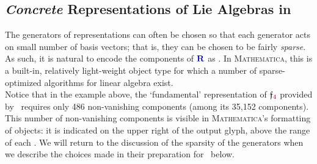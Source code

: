 \documentclass[12pt,a4paper]{article}\let\ifpdf\relax
\begin{document}
\subsection{\texorpdfstring{\emph{Concrete} Representations of Lie Algebras in \rpackage}{Concrete Representations of Lie Algebras in the Package}}\label{concrete_reps_in_package}\vspace{-4pt}


The generators of representations can often be chosen so that each generator acts on small number of basis vectors; that is, they can be chosen to be fairly \emph{sparse}. As such, it is natural to encode the components of $\mathbf{\b{R}}$ as . In \textsc{Mathematica}, this is a built-in, relatively light-weight object type for which a number of sparse-optimized algorithms for linear algebra exist. 
%
~\\[-18pt]






Notice that in the example above, the `fundamental' representation of $\mathfrak{f}_{\r{4}}$ provided by \rpackage~requires only 486 non-vanishing components (among its 35,152 components). This number of non-vanishing components is visible in \textsc{Mathematica}'s formatting of  objects: it is indicated on the upper right of the output glyph, above the range of each . We will return to the discussion of the sparsity of the generators when we describe the choices made in their preparation for \rpackage~below.\\[-10pt]
\end{document}
